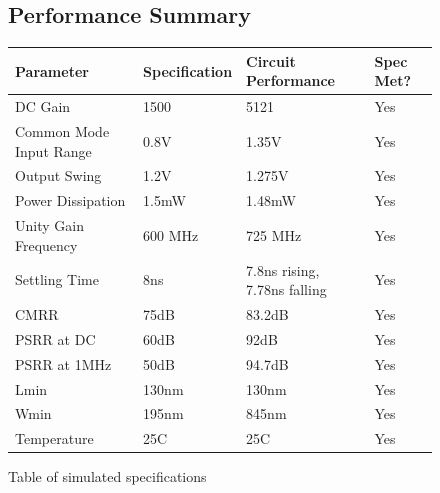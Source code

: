 \documentclass[]{article}
\begin{document}
			\begin{center}
			\begin{figure}
				\subsection{Performance Summary}
  				\begin{tabular}{ | l | l | l | p{2cm} |}
   			 		\hline
   			 		Parameter & Specification & Circuit Performance & Spec Met? \\ \hline
   			 		DC Gain & 1500 & 5121 & Yes\\ \hline
    					Common Mode Input Range & 0.8V & 1.35V & Yes\\ \hline
    					Output Swing & 1.2V & 1.275V & Yes\\ \hline
					Power Dissipation & 1.5mW & 1.48mW & Yes\\ \hline
					Unity Gain Frequency & 600 MHz & 725 MHz & Yes\\ \hline
					Settling Time & 8ns & 7.8ns rising, 7.78ns falling & Yes\\ \hline
					CMRR & 75dB & 83.2dB & Yes\\ \hline
					PSRR at DC & 60dB & 92dB & Yes\\ \hline
					PSRR at 1MHz & 50dB & 94.7dB & Yes\\ \hline
					Lmin & 130nm & 130nm & Yes\\ \hline
					Wmin & 195nm & 845nm & Yes\\ \hline
					Temperature & 25C & 25C & Yes\\ \hline
  			  	\end{tabular}
			\caption{Table of simulated specifications}
			\end{figure}
			\end{center}
			
		\newpage
		
\end{document}
